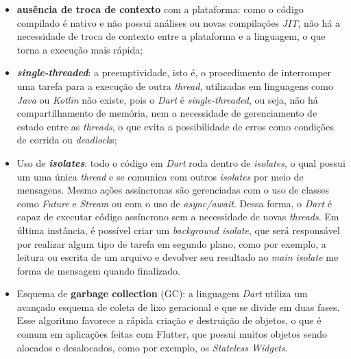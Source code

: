 \begin{itemize}
  \item \textbf{ausência de troca de contexto} com a plataforma: como o código compilado é nativo e não possui análises ou novas compilações \textit{JIT}, não há a necessidade de troca de contexto entre a plataforma e a linguagem, o que torna a execução mais rápida;
  \item \textbf{\textit{single-threaded}}: a preemptividade, isto é, o procedimento de interromper uma tarefa para a execução de outra \textit{thread}, utilizadas em linguagens como \textit{Java} ou \textit{Kotlin} não existe, pois o \textit{Dart} é \textit{single-threaded}, ou seja, não há compartilhamento de memória, nem a necessidade de gerenciamento de estado entre as \textit{threads}, o que evita a possibilidade de erros como condições de corrida ou \textit{deadlock}s;
  \item Uso de \textbf{\textit{isolates}}: todo o código em \textit{Dart} roda dentro de \textit{isolates}, o qual possui um uma única \textit{thread} e se comunica com outros \textit{isolates} por meio de mensagens. Mesmo ações assíncronas são gerenciadas com o uso de classes como \textit{Future} e \textit{Stream} ou com o uso de \textit{async/await}. Dessa forma, o \textit{Dart} é capaz de executar código assíncrono sem a necessidade de novas \textit{threads}. Em última instância, é possível criar um \textit{background isolate}, que será responsável por realizar algum tipo de tarefa em segundo plano, como por exemplo, a leitura ou escrita de um arquivo e devolver seu resultado ao \textit{main isolate} me forma de mensagem quando finalizado.
  \item Esquema de \textbf{garbage collection} (GC): a linguagem \textit{Dart} utiliza um avançado esquema de coleta de lixo geracional e que se divide em duas fases. Esse algoritmo favorece a rápida criação e destruição de objetos, o que é comum em aplicações feitas com Flutter, que possui muitos objetos sendo alocados e desalocados, como por exemplo, os \textit{Stateless Widgets}.
\end{itemize}



